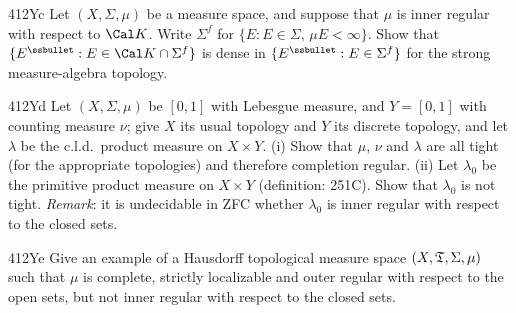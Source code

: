 {\spheader 412Yc Let $(X,\Sigma,\mu)$ be a measure space, and suppose
that $\mu$ is inner regular with respect to
$\Cal K$.   Write $\Sigma^f$ for $\{E:E\in\Sigma$, $\mu E<\infty\}$.    Show that
$\{E^{\ssbullet}:E\in\Cal K\cap\Sigma^f\}$ is dense in
$\{E^{\ssbullet}:E\in\Sigma^f\}$ for the strong measure-algebra
topology.

\spheader 412Yd Let $(X,\Sigma,\mu)$ be $[0,1]$ with Lebesgue measure,
and $Y=[0,1]$ with counting measure $\nu$;  give $X$ its usual topology
and $Y$ its discrete topology, and let $\lambda$ be the c.l.d.\ product
measure on $X\times Y$.   (i) Show that $\mu$, $\nu$ and $\lambda$ are
all tight (for the appropriate
topologies) and therefore completion regular.
(ii) Let $\lambda_0$ be the primitive product measure on
$X\times Y$ (definition:  251C).   Show that $\lambda_0$ is not tight.
{\it Remark\/}:  it is undecidable in ZFC whether $\lambda_0$ is inner
regular with respect to the closed sets.

\spheader 412Ye Give an example of a Hausdorff topological measure space
$(X,\frak T,\Sigma,\mu)$ such that $\mu$ is complete, strictly
localizable and outer regular with respect to the open sets, but not
inner regular with respect to the closed sets.
}%


